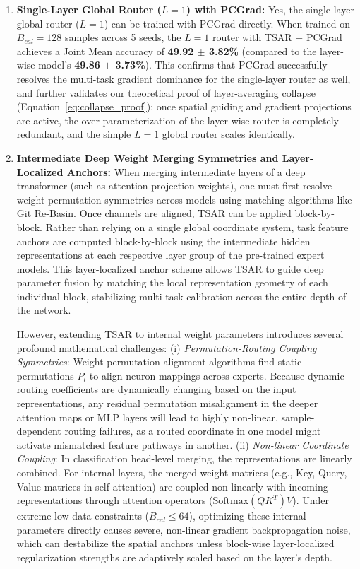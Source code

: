 \begin{enumerate}
    \item \textbf{Single-Layer Global Router ($L=1$) with PCGrad:}
    Yes, the single-layer global router ($L=1$) can be trained with PCGrad directly. When trained
on $B_{cal}=128$ samples across 5 seeds, the $L=1$ router with TSAR + PCGrad achieves a Joint Mean
accuracy of \textbf{49.92 $\pm$ 3.82\%} (compared to the layer-wise model's \textbf{49.86 $\pm$
3.73\%}). This confirms that PCGrad successfully resolves the multi-task gradient dominance for the
single-layer router as well, and further validates our theoretical proof of layer-averaging collapse
(Equation~\ref{eq:collapse_proof}): once spatial guiding and gradient projections are active, the
over-parameterization of the layer-wise router is completely redundant, and the simple $L=1$ global
router scales identically.

    \item \textbf{Intermediate Deep Weight Merging Symmetries and Layer-Localized Anchors:}
    When merging intermediate layers of a deep transformer (such as attention projection weights),
one must first resolve weight permutation symmetries across models using matching algorithms like
Git Re-Basin. Once channels are aligned, TSAR can be applied block-by-block. Rather than relying on
a single global coordinate system, task feature anchors are computed block-by-block using the
intermediate hidden representations at each respective layer group of the pre-trained expert
models. This layer-localized anchor scheme allows TSAR to guide deep parameter fusion by matching the
local representation geometry of each individual block, stabilizing multi-task calibration across
the entire depth of the network.

However, extending TSAR to internal weight parameters introduces several profound mathematical challenges:
(i) \emph{Permutation-Routing Coupling Symmetries}: Weight permutation alignment algorithms find static permutations $P_l$ to align neuron mappings across experts. Because dynamic routing coefficients are dynamically changing based on the input representations, any residual permutation misalignment in the deeper attention maps or MLP layers will lead to highly non-linear, sample-dependent routing failures, as a routed coordinate in one model might activate mismatched feature pathways in another.
(ii) \emph{Non-linear Coordinate Coupling}: In classification head-level merging, the representations are linearly combined. For internal layers, the merged weight matrices (e.g., Key, Query, Value matrices in self-attention) are coupled non-linearly with incoming representations through attention operators ($\text{Softmax}(Q K^T) V$). Under extreme low-data constraints ($B_{cal} \le 64$), optimizing these internal parameters directly causes severe, non-linear gradient backpropagation noise, which can destabilize the spatial anchors unless block-wise layer-localized regularization strengths are adaptively scaled based on the layer's depth.


\end{enumerate}
